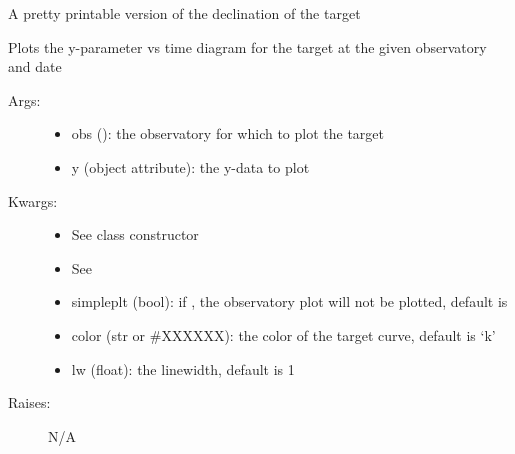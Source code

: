 \documentclass[letterpaper,10pt,english]{sphinxmanual}
\begin{document}
\begin{fulllineitems}
\begin{fulllineitems}
\end{fulllineitems}


\begin{fulllineitems}
\label{astroobs:astroobs.Target.decStr}
A pretty printable version of the declination of the target

\end{fulllineitems}


\begin{fulllineitems}
\label{astroobs:astroobs.Target.plot}
Plots the y-parameter vs time diagram for the target at the given observatory and date
\begin{description}
\item[{Args:}] \leavevmode\begin{itemize}
\item {} 
obs (): the observatory for which to plot the target

\item {} 
y (object attribute): the y-data to plot

\end{itemize}

\item[{Kwargs:}] \leavevmode\begin{itemize}
\item {} 
See class constructor

\item {} 
See 

\item {} 
simpleplt (bool): if , the observatory plot will not be plotted, default is 

\item {} 
color (str or \#XXXXXX): the color of the target curve, default is `k'

\item {} 
lw (float): the linewidth, default is 1

\end{itemize}

\item[{Raises:}] \leavevmode
N/A

\end{description}


\end{fulllineitems}
\end{fulllineitems}
\end{document}
